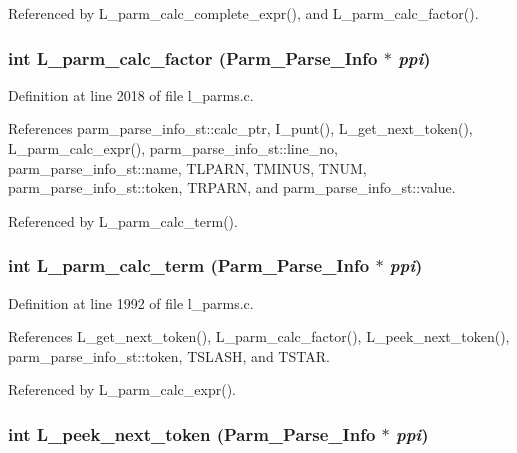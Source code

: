 Referenced by L\_\-parm\_\-calc\_\-complete\_\-expr(), and L\_\-parm\_\-calc\_\-factor().
\subsubsection{\setlength{\rightskip}{0pt plus 5cm}int L\_\-parm\_\-calc\_\-factor (\bf{Parm\_\-Parse\_\-Info} $\ast$ {\em ppi})}\label{l__parms_8c_25b2cc41359c9986b0621e8e529b252a}




Definition at line 2018 of file l\_\-parms.c.

References parm\_\-parse\_\-info\_\-st::calc\_\-ptr, I\_\-punt(), L\_\-get\_\-next\_\-token(), L\_\-parm\_\-calc\_\-expr(), parm\_\-parse\_\-info\_\-st::line\_\-no, parm\_\-parse\_\-info\_\-st::name, TLPARN, TMINUS, TNUM, parm\_\-parse\_\-info\_\-st::token, TRPARN, and parm\_\-parse\_\-info\_\-st::value.

Referenced by L\_\-parm\_\-calc\_\-term().
\subsubsection{\setlength{\rightskip}{0pt plus 5cm}int L\_\-parm\_\-calc\_\-term (\bf{Parm\_\-Parse\_\-Info} $\ast$ {\em ppi})}\label{l__parms_8c_ecd188d9e927027fdad268e4732f483c}




Definition at line 1992 of file l\_\-parms.c.

References L\_\-get\_\-next\_\-token(), L\_\-parm\_\-calc\_\-factor(), L\_\-peek\_\-next\_\-token(), parm\_\-parse\_\-info\_\-st::token, TSLASH, and TSTAR.

Referenced by L\_\-parm\_\-calc\_\-expr().
\subsubsection{\setlength{\rightskip}{0pt plus 5cm}int L\_\-peek\_\-next\_\-token (\bf{Parm\_\-Parse\_\-Info} $\ast$ {\em ppi})}\label{l__parms_8c_62b8261e0d0f3321051b7dccf11ef24f}




